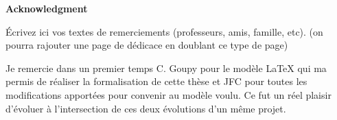\par\noindent\textbf{\huge{\color{blue}Acknowledgment}}

\vspace{3cm}

Écrivez ici vos textes de remerciements (professeurs, amis, famille, etc). (on pourra rajouter une page de dédicace en doublant ce type de page)


Je remercie dans un premier temps C. Goupy pour le modèle \LaTeX{} qui ma permis de réaliser la formalisation de cette thèse et JFC pour toutes les modifications apportées pour convenir au modèle voulu. Ce fut un réel plaisir d’évoluer à l’intersection de ces deux évolutions d'un même projet.


\vspace{1cm}

\newpage


